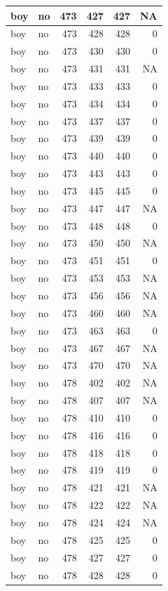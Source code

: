 \documentclass[man]{apa6}
\begin{document}
\begin{tabular}{l|l|r|r|r|r}
\hline
boy & no & 473 & 427 & 427 & NA\\
\hline
boy & no & 473 & 428 & 428 & 0\\
\hline
boy & no & 473 & 430 & 430 & 0\\
\hline
boy & no & 473 & 431 & 431 & NA\\
\hline
boy & no & 473 & 433 & 433 & 0\\
\hline
boy & no & 473 & 434 & 434 & 0\\
\hline
boy & no & 473 & 437 & 437 & 0\\
\hline
boy & no & 473 & 439 & 439 & 0\\
\hline
boy & no & 473 & 440 & 440 & 0\\
\hline
boy & no & 473 & 443 & 443 & 0\\
\hline
boy & no & 473 & 445 & 445 & 0\\
\hline
boy & no & 473 & 447 & 447 & NA\\
\hline
boy & no & 473 & 448 & 448 & 0\\
\hline
boy & no & 473 & 450 & 450 & NA\\
\hline
boy & no & 473 & 451 & 451 & 0\\
\hline
boy & no & 473 & 453 & 453 & NA\\
\hline
boy & no & 473 & 456 & 456 & NA\\
\hline
boy & no & 473 & 460 & 460 & NA\\
\hline
boy & no & 473 & 463 & 463 & 0\\
\hline
boy & no & 473 & 467 & 467 & NA\\
\hline
boy & no & 473 & 470 & 470 & NA\\
\hline
boy & no & 478 & 402 & 402 & NA\\
\hline
boy & no & 478 & 407 & 407 & NA\\
\hline
boy & no & 478 & 410 & 410 & 0\\
\hline
boy & no & 478 & 416 & 416 & 0\\
\hline
boy & no & 478 & 418 & 418 & 0\\
\hline
boy & no & 478 & 419 & 419 & 0\\
\hline
boy & no & 478 & 421 & 421 & NA\\
\hline
boy & no & 478 & 422 & 422 & NA\\
\hline
boy & no & 478 & 424 & 424 & NA\\
\hline
boy & no & 478 & 425 & 425 & 0\\
\hline
boy & no & 478 & 427 & 427 & 0\\
\hline
boy & no & 478 & 428 & 428 & 0\\

\end{tabular}
\end{document}
